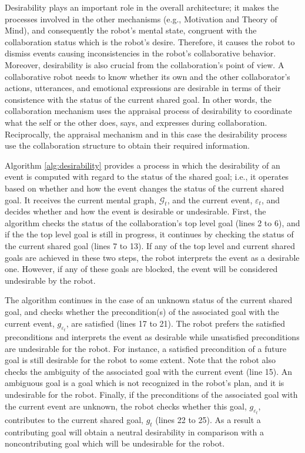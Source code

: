 \documentclass{aamas2016}
\begin{document}
Desirability plays an important role in the overall architecture; it makes the
processes involved in the other mechanisms (e.g., Motivation and Theory of
Mind), and consequently the robot's mental state, congruent with the
collaboration status which is the robot's desire. Therefore, it causes the robot
to dismiss events causing inconsistencies in the robot's collaborative behavior.
Moreover, desirability is also crucial from the collaboration's point of view. A
collaborative robot needs to know whether its own and the other collaborator's
actions, utterances, and emotional expressions are desirable in terms of their
consistence with the status of the current shared goal. In other words, the
collaboration mechanism uses the appraisal process of desirability to coordinate
what the self or the other does, says, and expresses during collaboration.
Reciprocally, the appraisal mechanism and in this case the desirability process
use the collaboration structure to obtain their required information.

Algorithm \ref{alg:desirability} provides a process in which the desirability of
an event is computed with regard to the status of the shared goal; i.e., it
operates based on whether and how the event changes the status of the current
shared goal. It receives the current mental graph, $\mathcal{G}_{t}$, and the
current event, $\varepsilon_t$, and decides whether and how the event is
desirable or undesirable. First, the algorithm checks the status of the
collaboration's top level goal (lines 2 to 6), and if the the top level goal is
still in progress, it continues by checking the status of the current shared
goal (lines 7 to 13). If any of the top level and current shared goals are
achieved in these two steps, the robot interprets the event as a desirable one.
However, if any of these goals are blocked, the event will be considered
undesirable by the robot.

The algorithm continues in the case of an unknown status of the current shared
goal, and checks whether the precondition(s) of the associated goal with the
current event, $\mathit{g}_{\varepsilon_t}$, are satisfied (lines 17 to 21).
The robot prefers the satisfied preconditions and interprets the event as
desirable while unsatisfied preconditions are undesirable for the robot. For
instance, a satisfied precondition of a future goal is still desirable for the
robot to some extent. Note that the robot also checks the ambiguity of the
associated goal with the current event (line 15). An ambiguous goal is a goal
which is not recognized in the robot's plan, and it is undesirable for the
robot. Finally, if the preconditions of the associated goal with the current
event are unknown, the robot checks whether this goal,
$\mathit{g}_{\varepsilon_t}$, contributes to the current shared goal,
$\mathit{g}_{t}$ (lines 22 to 25). As a result a contributing goal will obtain a
neutral desirability in comparison with a noncontributing goal which will be
undesirable for the robot.
\end{document}
